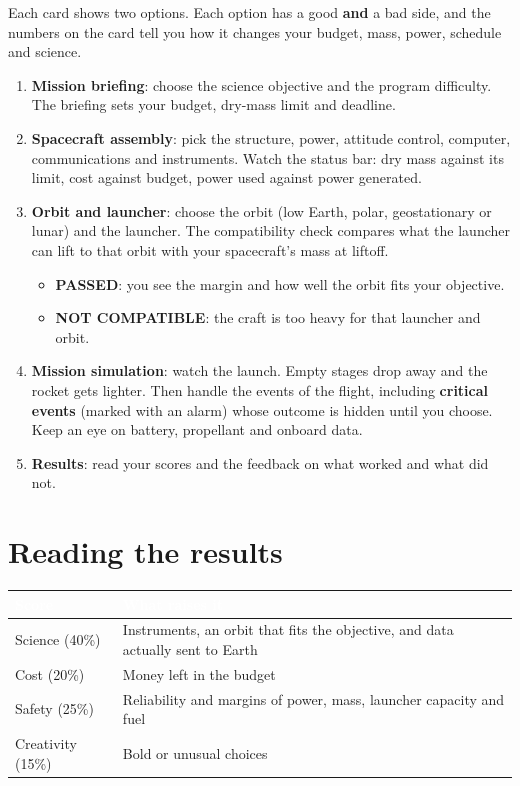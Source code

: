 \documentclass[11pt,a4paper]{article}
\newcommand{\hd}[1]{\textcolor{white}{\textbf{#1}}}   %
\begin{document}
Each card shows two options. Each option has a good \textbf{and} a bad side,
and the numbers on the card tell you how it changes your budget, mass, power,
schedule and science.

\begin{enumerate}[leftmargin=*]
  \item \textbf{Mission briefing}: choose the science objective and the program
        difficulty. The briefing sets your budget, dry-mass limit and deadline.
  \item \textbf{Spacecraft assembly}: pick the structure, power, attitude
        control, computer, communications and instruments. Watch the status
        bar: dry mass against its limit, cost against budget, power used
        against power generated.
  \item \textbf{Orbit and launcher}: choose the orbit (low Earth, polar,
        geostationary or lunar) and the launcher. The compatibility check
        compares what the launcher can lift to that orbit with your
        spacecraft's mass at liftoff.
        \begin{itemize}
          \item \textbf{PASSED}: you see the margin and how well the orbit fits
                your objective.
          \item \textbf{NOT COMPATIBLE}: the craft is too heavy for that
                launcher and orbit.
        \end{itemize}
  \item \textbf{Mission simulation}: watch the launch. Empty stages drop away
        and the rocket gets lighter. Then handle the events of the flight,
        including \textbf{critical events} (marked with an alarm) whose outcome
        is hidden until you choose. Keep an eye on battery, propellant and
        onboard data.
  \item \textbf{Results}: read your scores and the feedback on what worked and
        what did not.
\end{enumerate}

\section{Reading the results}

\begin{tabularx}{\textwidth}{@{}lL@{}}
\toprule
{}\hd{Score} & \hd{What raises it} \\
\midrule
Science (40\%)    & Instruments, an orbit that fits the objective, and data actually sent to Earth \\
Cost (20\%)       & Money left in the budget \\
Safety (25\%)     & Reliability and margins of power, mass, launcher capacity and fuel \\
Creativity (15\%) & Bold or unusual choices \\
\bottomrule
\end{tabularx}
\end{document}

